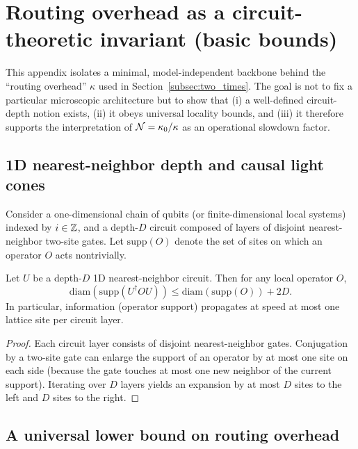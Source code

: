\section{Routing overhead as a circuit-theoretic invariant (basic bounds)}
\label{app:routing_overhead}

This appendix isolates a minimal, model-independent backbone behind the ``routing overhead'' $\kappa$ used in Section~\ref{subsec:two_times}. The goal is not to fix a particular microscopic architecture but to show that (i) a well-defined circuit-depth notion exists, (ii) it obeys universal locality bounds, and (iii) it therefore supports the interpretation of $\mathcal{N}=\kappa_0/\kappa$ as an operational slowdown factor.

\subsection{1D nearest-neighbor depth and causal light cones}
\label{app:lightcone}

Consider a one-dimensional chain of qubits (or finite-dimensional local systems) indexed by $i\in\mathbb{Z}$, and a depth-$D$ circuit composed of layers of disjoint nearest-neighbor two-site gates.
Let $\mathrm{supp}(O)$ denote the set of sites on which an operator $O$ acts nontrivially.

\begin{lemma}
\label{lem:lightcone}
Let $U$ be a depth-$D$ 1D nearest-neighbor circuit. Then for any local operator $O$,
\begin{equation}
  \mathrm{diam}\!\left(\mathrm{supp}(U^\dagger O U)\right)
  \le \mathrm{diam}\!\left(\mathrm{supp}(O)\right) + 2D.
\end{equation}
In particular, information (operator support) propagates at speed at most one lattice site per circuit layer.
\end{lemma}

\begin{proof}
Each circuit layer consists of disjoint nearest-neighbor gates. Conjugation by a two-site gate can enlarge the support of an operator by at most one site on each side (because the gate touches at most one new neighbor of the current support). Iterating over $D$ layers yields an expansion by at most $D$ sites to the left and $D$ sites to the right.
\end{proof}

\subsection{A universal lower bound on routing overhead}
\label{app:routing_lower_bound}

